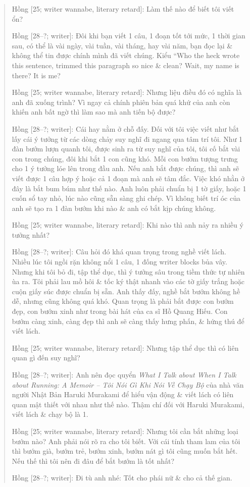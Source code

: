 \documentclass[12pt,oneside]{book}
\begin{document}
\begin{quote}
	{\sf Hồng [25; writer wannabe, literary retard]}: Làm thế nào để biết tôi viết ổn?
	
	{\sf Hồng [28--?; writer]}: Đôi khi bạn viết 1 câu, 1 đoạn tốt tới mức, 1 thời gian sau, có thể là vài ngày, vài tuần, vài tháng, hay vài năm, bạn đọc lại \& không thể tin được chính mình đã viết chúng. Kiểu ``Who the heck wrote this sentence, trimmed this paragraph so nice \& clean? Wait, my name is there? It is me?
	
	{\sf Hồng [25; writer wannabe, literary retard]}: Nhưng liệu điều đó có nghĩa là anh đã xuống trình? Vì ngay cả chính phiên bản quá khứ của anh còn khiến anh bất ngờ thì làm sao mà anh tiến bộ được?
	
	{\sf Hồng [28--?; writer]}: Cái hay nằm ở chỗ đấy. Đối với tôi việc viết như bắt lấy cái ý tưởng từ các dòng chảy suy nghĩ đi ngang qua tâm trí tôi. Như 1 đàn bướm lượn quanh tôi, được sinh ra từ suy nghĩ của tôi, tôi cố bắt vài con trong chúng, đôi khi bắt 1 con cũng khó. Mỗi con bướm tượng trưng cho 1 ý tưởng lóe lên trong đầu anh. Nếu anh bắt được chúng, thì anh sẽ viết được 1 câu hợp ý hoặc cả 1 đoạn mà anh sẽ tâm đắc. Việc khó nhằn ở đây là bắt bum búm như thế nào. Anh luôn phải chuẩn bị 1 tờ giấy, hoặc 1 cuốn sổ tay nhỏ, lúc nào cũng sẵn sàng ghi chép. Vì không biết trí óc của anh sẽ tạo ra 1 đàn bướm khi nào \& anh có bắt kịp chúng không.
	
	{\sf Hồng [25; writer wannabe, literary retard]}: Khi nào thì anh nảy ra nhiều ý tưởng nhất?
	
	{\sf Hồng [28--?; writer]}: Câu hỏi đó khá quan trọng trong nghề viết lách. Nhiều lúc tôi ngồi rặn không nổi 1 câu, 1 đống writer blocks bủa vây. Nhưng khi tôi bỏ đi, tập thể dục, thì ý tưởng sâu trong tiềm thức tự nhiên ùa ra. Tôi phải lau mồ hôi \& tốc ký thật nhanh vào các tờ giấy trắng hoặc cuộn giấy súc được chuẩn bị sẵn. Anh thấy đấy, nghề bắt bướm không hề dễ, nhưng cũng không quá khó. Quan trọng là phải bắt được con bướm đẹp, con bướm xinh như trong bài hát của ca sĩ {\sc Hồ Quang Hiếu}. Con bướm càng xinh, càng đẹp thì anh sẽ càng thấy hưng phấn, \& hứng thú để viết lách.
	
	{\sf Hồng [25; writer wannabe, literary retard]}: Nhưng tập thể dục thì có liên quan gì đến suy nghĩ?
	
	{\sf Hồng [28--?; writer]}: Anh nên đọc quyển {\it What I Talk about When I Talk about Running: A Memoir -- Tôi Nói Gì Khi Nói Về Chạy Bộ} của nhà văn người Nhật Bản {\sc Haruki Murakami} để hiểu vận động \& viết lách có liên quan mật thiết với nhau như thế nào. Thậm chí đối với {\sc Haruki Murakami}, viết lách \& chạy bộ là 1.
	
	{\sf Hồng [25; writer wannabe, literary retard]}: Nhưng tôi cần bắt những loại bướm nào? Anh phải nói rõ ra cho tôi biết. Với cái tính tham lam của tôi thì bướm già, bướm trẻ, bướm xinh, bướm nát gì tôi cũng muốn bắt hết. Nếu thế thì tôi nên đi đâu để bắt bướm là tốt nhất?
	
	{\sf Hồng [28--?; writer]}: Đi tù anh nhé: Tốt cho phái nữ \& cho cả thế gian.
\end{quote}
\end{document}

